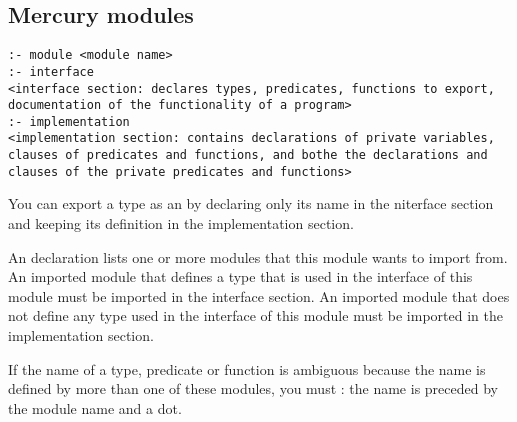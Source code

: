 \subsection{Mercury modules}
\begin{compactitem}
\item \begin{lstlisting}
:- module <module name>
:- interface
<interface section: declares types, predicates, functions to export, documentation of the functionality of a program>
:- implementation
<implementation section: contains declarations of private variables, clauses of predicates and functions, and bothe the declarations and clauses of the private predicates and functions>
\end{lstlisting}

\item You can export a type as an  by declaring only its name in the niterface section and keeping its definition in the implementation section.

\item An  declaration lists one or more modules that this module wants to import from. An imported module that defines a type that is used in the interface of this module must be imported in the interface section. An imported module that does not define any type used in the interface of this module must be imported in the implementation section.

\item If the name of a type, predicate or function is ambiguous because the name is defined by more than
one of these modules, you must : the name is preceded by the
module name and a dot.

\end{compactitem}


